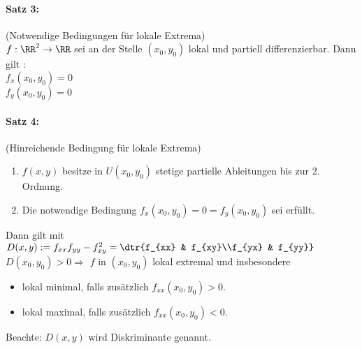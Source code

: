 \paragraph{Satz 3:} (Notwendige Bedingungen für lokale Extrema)\\
$f: \RR^2\to \RR$ sei an der Stelle $(x_0,y_0)$ lokal und partiell differenzierbar. Dann gilt :\\
$f_x(x_0,y_0)=0$\\
$f_y(x_0,y_0)=0$
\paragraph{Satz 4:} (Hinreichende Bedingung für lokale Extrema)
\begin{enumerate}
\item $f(x,y)$ besitze in $U(x_0,y_0)$ stetige partielle Ableitungen bis zur 2. Ordnung.
\item Die notwendige Bedingung $f_x(x_0,y_0)=0=f_y(x_0,y_0)$ sei erfüllt.
\end{enumerate}
Dann gilt mit $D(x,y):= f_{xx}f_{yy}-f_{xy}^2=\dtr{f_{xx} & f_{xy}\\f_{yx} & f_{yy}}$\\
$\boxed{D(x_0,y_0)>0} \Rightarrow$ $f$ in $(x_0,y_0)$ lokal extremal und insbesondere 
\begin{itemize}
\item lokal minimal, falls zusätzlich $f_{xx}(x_0,y_0) >0$.
\item lokal maximal, falls zusätzlich $f_{xx}(x_0,y_0) <0$.
\end{itemize}
Beachte: $D(x,y)$ wird Diskriminante genannt.


